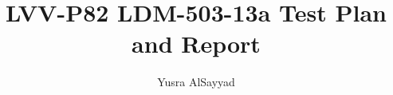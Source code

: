 \documentclass[DM,lsstdraft,toc]{lsstdoc}
\begin{document}
\def\milestoneName{LDM-503-13a}
\def\milestoneId{LVV-P82}
\def\product{Data Management}


\title{LVV-P82 LDM-503-13a Test Plan and Report}
\setDocRef{\lsstDocType-\lsstDocNum}
\date{\vcsDate}
\author{Yusra AlSayyad}



\end{document}
